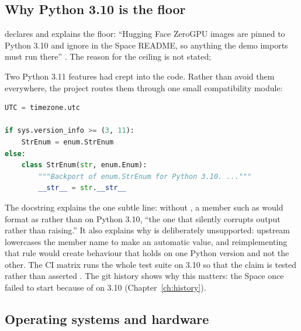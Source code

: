 \subsection{Why Python 3.10 is the floor}

 declares  and explains the floor: \enquote{Hugging Face ZeroGPU images are pinned to Python 3.10 and ignore  in the Space README, so anything the demo imports must run there} . The reason for the  ceiling is not stated; \NotDet

Two Python 3.11 features had crept into the code. Rather than avoid them everywhere, the project routes them through one small compatibility module:

\begin{lstlisting}[language=Python]
UTC = timezone.utc

if sys.version_info >= (3, 11):
    StrEnum = enum.StrEnum
else:
    class StrEnum(str, enum.Enum):
        """Backport of enum.StrEnum for Python 3.10. ..."""
        __str__ = str.__str__
\end{lstlisting}

The docstring explains the one subtle line: without , a member such as  would format as  rather than  on Python 3.10, \enquote{the one that silently corrupts output rather than raising.} It also explains why  is deliberately unsupported: upstream  lowercases the member name to make an automatic value, and reimplementing that rule would create behaviour that holds on one Python version and not the other. The CI matrix runs the whole test suite on 3.10 so that the claim is tested rather than asserted . The git history shows why this matters: the Space once failed to start because of  on 3.10 (Chapter~\ref{ch:history}).

\subsection{Operating systems and hardware}

